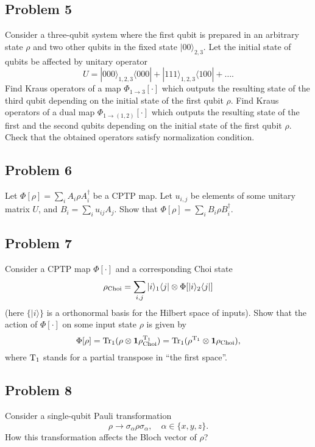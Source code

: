 \documentclass[a4paper,10pt]{article}
\newcommand{\ket}[1]{|#1\rangle}
\newcommand{\bra}[1]{\langle#1|}
\newcommand{\tr}{\ensuremath{{\rm Tr}}}
\begin{document}
\subsection*{Problem 5}
Consider a three-qubit system where the first qubit is prepared in an arbitrary state $\rho$ and two other qubits in the fixed state $\ket{00}_{2,3}$.
Let the initial state of qubits be affected by unitary operator
\begin{equation}
	U = \ket{000}_{1,2,3}\bra{000} +  \ket{111}_{1,2,3}\bra{100} + \ldots.
\end{equation}
Find Kraus operators of a map $\Phi_{1\rightarrow 3}[\cdot]$ which outputs the resulting state of the third qubit depending on the initial state of the first qubit $\rho$.
Find Kraus operators of a dual map $\Phi_{1\rightarrow (1,2)}[\cdot]$ which outputs the resulting state of the first and the second qubits depending on the initial state of the first qubit $\rho$.
Check that the obtained operators satisfy normalization condition.


\subsection*{Problem 6}
Let $\Phi[\rho]=\sum_{i}A_{i}\rho A_{i}^{\dagger}$ be a CPTP map.
Let $u_{i,j}$ be elements of some unitary matrix $U$, and $B_{i}=\sum_{i}u_{ij}A_{j}$.
Show that $\Phi[\rho]=\sum_{i}B_{i}\rho B_{i}^{\dagger}$.


\subsection*{Problem 7}
Consider a CPTP map $\Phi[\cdot]$ and a corresponding Choi state
\begin{equation}
	\rho_{\rm Choi} = \sum_{i,j} \ket{i}_{1}\bra{j}\otimes\Phi[\ket{i}_{2}\bra{j}]
\end{equation}
(here $\{\ket{i}\}$ is a orthonormal basis for the Hilbert space of inputs).
Show that the action of $\Phi[\cdot]$ on some input state $\rho$ is given by
\begin{equation}
	\Phi[\rho]=\tr_{1}(\rho\otimes {\bf 1} \rho_{\rm Choi}^{\rm T_{1}})=
	\tr_{1}(\rho^{\rm T_{1}}\otimes {\bf 1} \rho_{\rm Choi}),
\end{equation}
where ${\rm T}_{1}$ stands for a partial transpose in ``the first space''.


\subsection*{Problem 8}
Consider a single-qubit Pauli transformation 
\begin{equation}
	\rho\rightarrow \sigma_{\alpha}\rho\sigma_{\alpha}, \quad \alpha\in\{x,y,z\}.
\end{equation}
How this transformation affects the Bloch vector of $\rho$?
\end{document}
